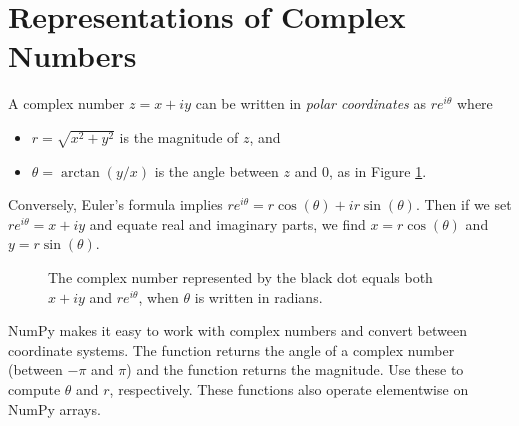 \label{Lab:complex_intro}


\section*{Representations of Complex Numbers}

A complex number $z = x+iy$ can be written in \emph{polar coordinates} as $re^{i\theta}$ where
\begin{itemize}
\item $r=\sqrt{x^2+y^2}$ is the magnitude of $z$, and
\item $\theta = \arctan(y/x)$ is the angle between $z$ and 0, as in Figure \ref{fig:polar_coords}.
\end{itemize}
Conversely, Euler's formula implies $re^{i\theta} = r\cos(\theta) + ir\sin(\theta)$. Then if we set $re^{i\theta}=x+iy$ and equate real and imaginary parts, we find $x=r\cos(\theta)$ and $y=r\sin(\theta)$.

\begin{figure}
\caption{The complex number represented by the black dot equals both $x+iy$ and $re^{i\theta}$, when $\theta$ is written in radians.}
\label{fig:polar_coords}
\end{figure}

NumPy makes it easy to work with complex numbers and convert between coordinate systems.
The function  returns the angle of a complex number (between $-\pi$ and $\pi$) and the function  returns the magnitude.
Use these to compute $\theta$ and $r$, respectively.
These functions also operate elementwise on NumPy arrays.


